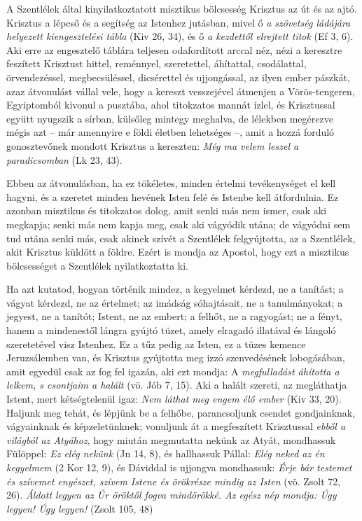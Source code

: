 \documentclass[twoside]{article}
\begin{document}
\begin{lectio}{A Szentlélek által kinyilatkoztatott misztikus bölcsesség}
\noindent Krisztus az út és az ajtó. Krisztus a lépcső és a segítség az Istenhez jutásban, mivel ő \textit{a szövetség ládájára helyezett kiengesztelési tábla} (Kiv 26, 34), és ő \textit{a kezdettől elrejtett titok} (Ef 3, 6). Aki erre az engesztelő táblára teljesen odafordított arccal néz, nézi a keresztre feszített Krisztust hittel, reménnyel, szeretettel, áhítattal, csodálattal, örvendezéssel, megbecsüléssel, dicsérettel és ujjongással, az ilyen ember pászkát, azaz átvonulást vállal vele, hogy a kereszt vesszejével átmenjen a Vörös-tengeren, Egyiptomból kivonul a pusztába, ahol titokzatos mannát ízlel, és Krisztussal együtt nyugszik a sírban, külsőleg mintegy meghalva, de lélekben megérezve mégis azt – már amennyire e földi életben lehetséges –, amit a hozzá forduló gonosztevőnek mondott Krisztus a kereszten: \textit{Még ma velem leszel a paradicsomban} (Lk 23, 43).

Ebben az átvonulásban, ha ez tökéletes, minden értelmi tevékenységet el kell hagyni, és a szeretet minden hevének Isten felé és Istenbe kell átfordulnia. Ez azonban misztikus és titokzatos dolog, amit senki más nem ismer, csak aki megkapja; senki más nem kapja meg, csak aki vágyódik utána; de vágyódni sem tud utána senki más, csak akinek szívét a Szentlélek felgyújtotta, az a Szentlélek, akit Krisztus küldött a földre. Ezért is mondja az Apostol, hogy ezt a misztikus bölcsességet a Szentlélek nyilatkoztatta ki.

Ha azt kutatod, hogyan történik mindez, a kegyelmet kérdezd, ne a tanítást; a vágyat kérdezd, ne az értelmet; az imádság sóhajtásait, ne a tanulmányokat; a jegyest, ne a tanítót; Istent, ne az embert; a felhőt, ne a ragyogást; ne a fényt, hanem a mindenestől lángra gyújtó tüzet, amely elragadó illatával és lángoló szeretetével visz Istenhez. Ez a tűz pedig az Isten, ez a tüzes kemence Jeruzsálemben van, és Krisztus gyújtotta meg izzó szenvedésének lobogásában, amit egyedül csak az fog fel igazán, aki ezt mondja: A \textit{megfulladást áhította a lelkem, s csontjaim a halált} (vö. Jób 7, 15). Aki a halált szereti, az megláthatja Istent, mert kétségtelenül igaz: \textit{Nem láthat meg engem élő ember} (Kiv 33, 20). Haljunk meg tehát, és lépjünk be a felhőbe, parancsoljunk csendet gondjainknak, vágyainknak és képzeletünknek; vonuljunk át a megfeszített Krisztussal \textit{ebből a világból az Atyához}, hogy miután megmutatta nekünk az Atyát, mondhassuk Fülöppel: \textit{Ez elég nekünk} (Jn 14, 8), és hallhassuk Pállal: \textit{Elég neked az én kegyelmem} (2 Kor 12, 9), és Dáviddal is ujjongva mondhassuk: \textit{Érje bár testemet és szívemet enyészet, szívem Istene és örökrésze mindig az Isten} (vö. Zsolt 72, 26). \textit{Áldott legyen az Úr öröktől fogva mindörökké. Az egész nép mondja: Úgy legyen! Úgy legyen!} (Zsolt 105, 48)
\end{lectio}
\end{document}
